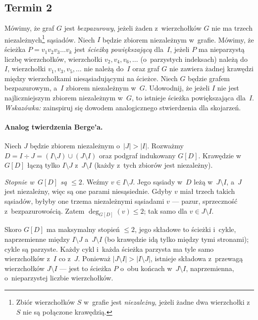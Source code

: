 \subsection{Termin 2}

\begin{zadanie}
	Mówimy, że graf $G$ jest \emph{bezpazurowy}, jeżeli żaden z~wierzchołków $G$
	nie ma trzech niezależnych\footnote{Zbiór wierzchołków $S$ w~grafie jest
	\emph{niezależny}, jeżeli żadne dwa wierzchołki z~$S$ nie są połączone
	krawędzią.} sąsiadów. Niech $I$ będzie zbiorem niezależnym w~grafie. Mówimy,
	że ścieżka $P=v_1v_2v_3\dots v_k$ jest \emph{ścieżką powiększającą} dla~$I$,
	jeżeli $P$ ma nieparzystą liczbę wierzchołków, wierzchołki $v_2,v_4,v_6,\dots$
	(o~parzystych indeksach) należą do~$I$, wierzchołki $v_1,v_3,v_5,\dots$ nie
	należą do~$I$ oraz graf $G$ nie zawiera żadnej krawędzi między wierzchołkami
	niesąsiadującymi na ścieżce. Niech $G$ będzie grafem bezpazurowym, a~$I$
	zbiorem niezależnym w~$G$. Udowodnij, że jeżeli $I$ nie jest najliczniejszym
	zbiorem niezależnym w~$G$, to istnieje ścieżka powiększająca dla~$I$.
	\emph{Wskazówka:} zainspiruj się dowodem analogicznego stwierdzenia dla
	skojarzeń.
\end{zadanie}

\paragraph{Analog twierdzenia Berge'a.}
Niech $J$ będzie zbiorem niezależnym o~$|J|>|I|$. Rozważmy
$D=I\div J=(I\setminus J)\cup(J\setminus I)$ oraz podgraf indukowany $G[D]$.
Krawędzie w~$G[D]$ łączą tylko $I\setminus J$ z~$J\setminus I$ (każdy z~tych
zbiorów jest niezależny).

\emph{Stopnie w~$G[D]$ są $\le 2$.} Weźmy $v\in I\setminus J$. Jego sąsiady
w~$D$ leżą w~$J\setminus I$, a~$J$ jest niezależny, więc są one parami
niesąsiednie. Gdyby $v$ miał trzech takich sąsiadów, byłyby one trzema
niezależnymi sąsiadami $v$ --- pazur, sprzeczność z~bezpazurowością. Zatem
$\deg_{G[D]}(v)\le 2$; tak samo dla $v\in J\setminus I$.

Skoro $G[D]$ ma maksymalny stopień $\le 2$, jego składowe to ścieżki i~cykle,
naprzemienne między $I\setminus J$ a~$J\setminus I$ (bo krawędzie idą tylko
między tymi stronami); cykle są parzyste. Każdy cykl i~każda ścieżka parzysta
ma tyle samo wierzchołków z~$I$ co z~$J$. Ponieważ $|J\setminus I|>|I\setminus J|$,
istnieje składowa z~przewagą wierzchołków $J\setminus I$ --- jest to ścieżka
$P$ o~obu końcach w~$J\setminus I$, naprzemienna, o~nieparzystej liczbie
wierzchołków.

